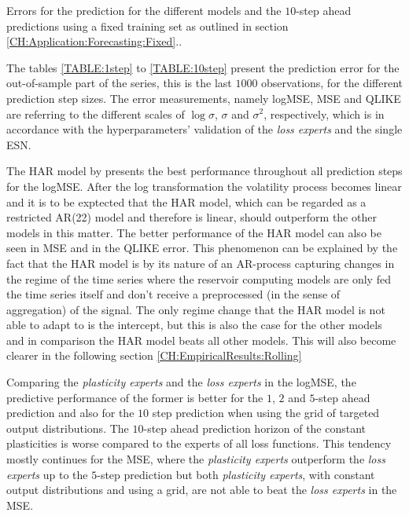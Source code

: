 \begin{table}
    \begin{center}
        
    \end{center}
    \caption{Errors for the prediction for the different models and the $10$-step ahead predictions using a fixed training set as outlined in section \ref{CH:Application:Forecasting:Fixed}..}
    \label{TABLE:10step}
\end{table}


The tables \ref{TABLE:1step} to \ref{TABLE:10step} present the prediction error for the out-of-sample part of the series, this is the last $1000$ observations, for the different prediction step sizes. 
The error measurements, namely logMSE, MSE and QLIKE are referring to the different scales of $\log{\sigma}$, $\sigma$ and $\sigma^2$, respectively, which is in accordance with the hyperparameters' validation of the \textit{loss experts} and the single ESN.

The HAR model by \cite{Corsi2009} presents the best performance throughout all prediction steps for the logMSE. After the log transformation the volatility process becomes linear and it is to be exptected that the HAR model, which can be regarded as a restricted AR(22) model and therefore is linear, should outperform the other models in this matter. The better performance of the HAR model can also be seen in MSE and in the QLIKE error. This phenomenon can be explained by the fact that the HAR model is by its nature of an AR-process capturing changes in the regime of the time series where the reservoir computing models are only fed the time series itself and don't receive a preprocessed (in the sense of aggregation) of the signal. The only regime change that the HAR model is not able to adapt to is the intercept, but this is also the case for the other models and in comparison the HAR model beats all other models. This will also become clearer in the following section \ref{CH:EmpiricalResults:Rolling}

Comparing the \textit{plasticity experts} and the \textit{loss experts} in the logMSE, the predictive performance of the former is better for the $1$, $2$ and $5$-step ahead prediction and also for the $10$ step prediction when using the grid of targeted output distributions. The $10$-step ahead prediction horizon of the constant plasticities is worse compared to the experts of all loss functions. This tendency mostly continues for the MSE, where the \textit{plasticity experts} outperform the \textit{loss experts} up to the $5$-step prediction but both \textit{plasticity experts}, with constant output distributions and using a grid, are not able to beat the \textit{loss experts} in the MSE.

